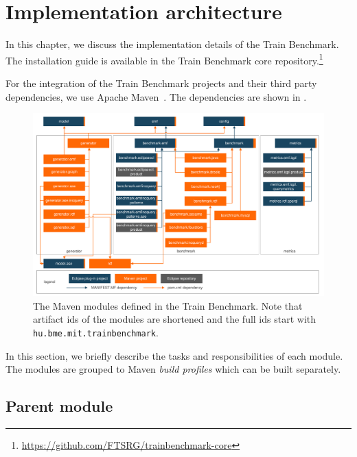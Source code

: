 \section{Implementation architecture}

In this chapter, we discuss the implementation details of the Train Benchmark. The installation guide is available in the Train Benchmark core repository.\footnote{\url{https://github.com/FTSRG/trainbenchmark-core}}


For the integration of the Train Benchmark projects and their third party dependencies, we use Apache Maven~\cite{Maven}. The dependencies are shown in .

\begin{figure}%
	\centering
	\includegraphics[width=\textwidth]{figures/trainbenchmark-modules}
	\caption{The Maven modules defined in the Train Benchmark. Note that artifact ids of the modules are shortened and the full ids start with \texttt{hu.bme.mit.trainbenchmark}.}
	\label{fig:trainbenchmark-modules}
\end{figure}

In this section, we briefly describe the tasks and responsibilities of each module. The modules are grouped to Maven \emph{build profiles} which can be built separately.

\subsection{Parent module}

